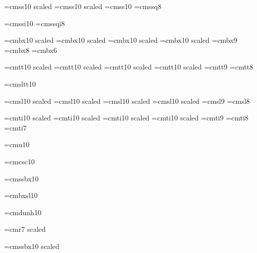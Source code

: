 %

%
\fontdef\fourteenss={cmss10 scaled }
\fontdef\twelvess={cmss10 scaled }
\font\tenss=cmss10
\font\eightss=cmssq8

%
\font\tenitss=cmssi10
\font\eightitss=cmssqi8

%
\fontdef\twentyfourbf={cmbx10 scaled }
\fontdef\eighteenbf={cmbx10 scaled }
\fontdef\fourteenbf={cmbx10 scaled }
\font\twelvebf=cmbx10 scaled 
\font\ninebf=cmbx9
\font\eightbf=cmbx8
\font\sixbf=cmbx6

%
\fontdef\twentyfourtt={cmtt10 scaled }
\fontdef\eighteentt={cmtt10 scaled }
\fontdef\fourteentt={cmtt10 scaled }
\fontdef\twelvett={cmtt10 scaled }
\font\ninett=cmtt9
\font\eighttt=cmtt8

%
\font\tensltt=cmsltt10

%
\fontdef\twentyfoursl={cmsl10 scaled }
\fontdef\eighteensl={cmsl10 scaled }
\fontdef\fourteensl={cmsl10 scaled }
\fontdef\twelvesl={cmsl10 scaled }
\font\ninesl=cmsl9
\font\eightsl=cmsl8

%
\fontdef\twentyfourit={cmti10 scaled }
\fontdef\eighteenit={cmti10 scaled }
\fontdef\fourteenit={cmti10 scaled }
\fontdef\twelveit={cmti10 scaled }
\font\nineit=cmti9
\font\eightit=cmti8
\fontdef\sevenit={cmti7}

%
\font\tenuit=cmu10


%
\font\tencsc=cmcsc10

%
\font\tenbfss=cmssbx10


%
\font\tenslbf=cmbxsl10


%
\font\tendh=cmdunh10

%
\font\titlefont=cmr7 scaled 


%
\font\bigfont=cmssbx10 scaled 



%
\def\rm{\fam\z@\def\fstyle{rm}\setfont}
\def\it{\fam\itfam\def\fstyle{it}\setfont}
\def\bf{\fam\bffam\def\fstyle{bf}\setfont\ifmmode{\tenbfsy}%
                                      \textfont2=\tenbfsy\fi}
\def\sl{\fam\slfam\def\fstyle{sl}\setfont}
\def\sa{\def\fstyle{ss}\setfont}
\def\tt{\fam\ttfam\def\fstyle{tt}\setfont}

